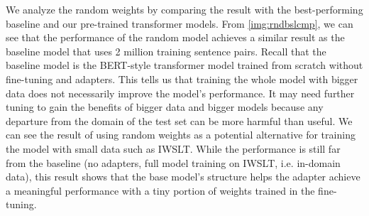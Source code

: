 We analyze the random weights by comparing the result with the best-performing baseline and our pre-trained transformer models. From \cref{img:rndbslcmp}, we can see that the performance of the random model achieves a similar result as the baseline model that uses 2 million training sentence pairs. Recall that the baseline model is the BERT-style transformer model trained from scratch without fine-tuning and adapters. This tells us that training the whole model with bigger data does not necessarily improve the model's performance. It may need further tuning to gain the benefits of bigger data and bigger models because any departure from the domain of the test set can be more harmful than useful. We can see the result of using random weights as a potential alternative for training the model with small data such as IWSLT. While the performance is still far from the baseline (no adapters, full model training on IWSLT, i.e. in-domain data), this result shows that the base model's structure helps the adapter achieve a meaningful performance with a tiny portion of weights trained in the fine-tuning.

